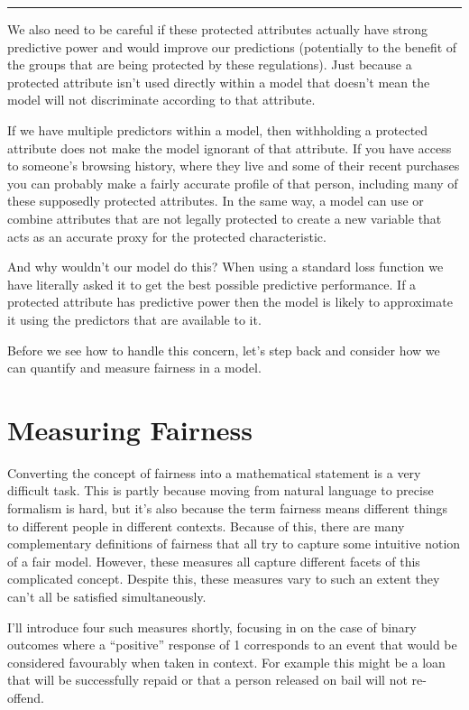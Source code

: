 \documentclass[
  letterpaper,
  DIV=11,
  numbers=noendperiod]{scrreprt}
\begin{document}
\begin{center}\rule{0.5\linewidth}{0.5pt}\end{center}

We also need to be careful if these protected attributes actually have
strong predictive power and would improve our predictions (potentially
to the benefit of the groups that are being protected by these
regulations). Just because a protected attribute isn't used directly
within a model that doesn't mean the model will not discriminate
according to that attribute.

If we have multiple predictors within a model, then withholding a
protected attribute does not make the model ignorant of that attribute.
If you have access to someone's browsing history, where they live and
some of their recent purchases you can probably make a fairly accurate
profile of that person, including many of these supposedly protected
attributes. In the same way, a model can use or combine attributes that
are not legally protected to create a new variable that acts as an
accurate proxy for the protected characteristic.

And why wouldn't our model do this? When using a standard loss function
we have literally asked it to get the best possible predictive
performance. If a protected attribute has predictive power then the
model is likely to approximate it using the predictors that are
available to it.

Before we see how to handle this concern, let's step back and consider
how we can quantify and measure fairness in a model.

\section{Measuring Fairness}\label{measuring-fairness}

Converting the concept of fairness into a mathematical statement is a
very difficult task. This is partly because moving from natural language
to precise formalism is hard, but it's also because the term fairness
means different things to different people in different contexts.
Because of this, there are many complementary definitions of fairness
that all try to capture some intuitive notion of a fair model. However,
these measures all capture different facets of this complicated concept.
Despite this, these measures vary to such an extent they can't all be
satisfied simultaneously.

I'll introduce four such measures shortly, focusing in on the case of
binary outcomes where a ``positive'' response of 1 corresponds to an
event that would be considered favourably when taken in context. For
example this might be a loan that will be successfully repaid or that a
person released on bail will not re-offend.
\end{document}
